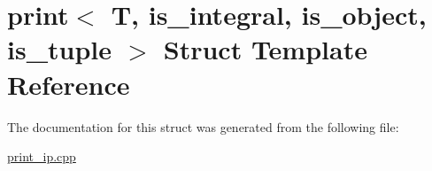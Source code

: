 \hypertarget{structprint}{}\section{print$<$ T, is\+\_\+integral, is\+\_\+object, is\+\_\+tuple $>$ Struct Template Reference}
\label{structprint}


The documentation for this struct was generated from the following file\+:\begin{DoxyCompactItemize}
\item 
\hyperlink{print__ip_8cpp}{print\+\_\+ip.\+cpp}\end{DoxyCompactItemize}
